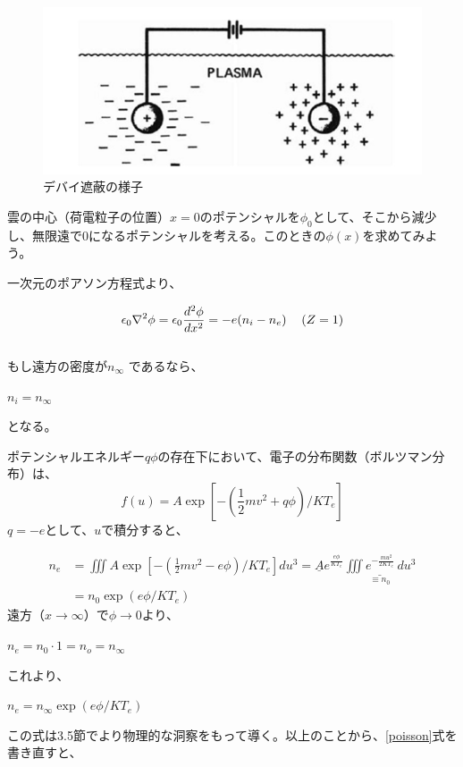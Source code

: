 \documentclass{ltjsarticle}
\numberwithin{equation}{section} %
\begin{document}
\begin{figure}[htbp]
  \centering
  \includegraphics[width=0.7\linewidth]{debye.png}
  \caption{デバイ遮蔽の様子}
  \label{fig.debye}
\end{figure}


雲の中心（荷電粒子の位置）$x=0$のポテンシャルを$\phi _0$として、そこから減少し、無限遠で0になるポテンシャルを考える。このときの$\phi (x)$を求めてみよう。

一次元のポアソン方程式より、

\begin{equation}
  \epsilon_0 \nabla^2 \phi = \epsilon_0 \frac{d^2\phi}{dx^2} = -e(n_i - n_e) \hspace{1pc}  (Z=1) \label{poisson}
\end{equation}
\\
もし遠方の密度が$n_\infty$ であるなら、
\begin{center}
  $n_i = n_\infty$
\end{center}
となる。

ポテンシャルエネルギー$q\phi$の存在下において、電子の分布関数（ボルツマン分布）は、
\begin{equation}
  f(u) = A\exp[-(\frac{1}{2}mv^2 + q\phi)/KT_e]
\end{equation}
$q=-e$として、$u$で積分すると、

\begin{align}
  n_e &= \iiint A\exp[-(\frac{1}{2}mv^2 - e\phi)/KT_e]du^3 = \underline{A}e^{\frac{e\phi}{K T_e}} 
\underset{\equiv n_0}{\underline{\iiint e^{-\frac{m u^2}{2 K T_e}} \, du^3}}\\
       &= n_0 \exp(e\phi/KT_e)
\end{align}
遠方（$x\to \infty$）で$\phi \to 0$より、
\begin{center}
  $n_e = n_0\cdot 1 = n_o = n_\infty$
\end{center}
これより、

\begin{center}
 $n_e =  n_\infty \exp(e\phi/KT_e)$
\end{center}
この式は3.5節でより物理的な洞察をもって導く。以上のことから、\eqref{poisson}式を書き直すと、
\end{document}
